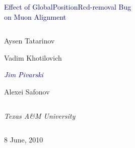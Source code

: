 \documentclass[compress]{beamer}
\begin{document}
\begin{frame}
\vfill
\begin{center}
\textcolor{darkblue}{\Large Effect of GlobalPositionRcd-removal Bug \\ \vspace{0.2 cm} on Muon Alignment}

\vfill
\begin{columns}
\begin{center}
\large
Aysen Tatarinov

Vadim Khotilovich

\textcolor{darkblue}{\it Jim Pivarski}

Alexei Safonov
\end{center}
\end{columns}

\begin{columns}
\begin{center}
\scriptsize
{\it Texas A\&M University}
\end{center}
\end{columns}

\vfill
 8 June, 2010

\end{center}
\end{frame}


\small

\end{document}
